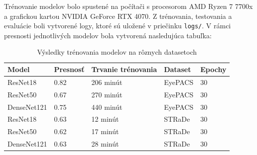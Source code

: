 \documentclass[a4paper, 11pt]{article}
\begin{document}
Trénovanie modelov bolo spustené na počítači s procesorom AMD Ryzen 7 7700x a grafickou kartou NVIDIA GeForce RTX 4070. Z trénovania, testovania a evaluácie boli vytvorené logy, ktoré sú uložené v priečinku \texttt{logs/}. V rámci presnosti jednotlivých modelov bola vytvorená nasledujúca tabuľka:
\begin{table}[h]
\centering
\begin{tabular}{|l|l|l|l|l|}
\hline
\textbf{Model} & \textbf{Presnosť} & \textbf{Trvanie trénovania} & \textbf{Dataset} & \textbf{Epochy} \\ \hline
ResNet18 & 0.82 & 206 minút & EyePACS & 30 \\ \hline
ResNet50 & 0.67 & 270 minút & EyePACS & 30 \\ \hline
DenseNet121 & 0.75 & 440 minút & EyePACS & 30 \\ \hline
ResNet18 & 0.63 & 12 minút & STRaDe & 30 \\ \hline
ResNet50 & 0.62 & 17 minút & STRaDe & 30 \\ \hline
DenseNet121 & 0.63 & 28 minút & STRaDe & 30 \\ \hline
\end{tabular}
\caption{Výsledky trénovania modelov na rôznych datasetoch}
\label{tab:train-results}
\end{table}
\end{document}
